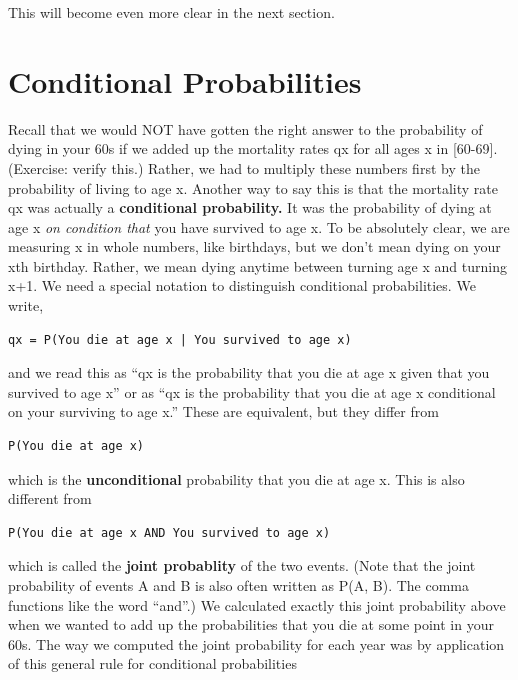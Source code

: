\documentclass[openany]{book}
\begin{document}
This will become even more clear in the next section.

\hypertarget{conditional-probabilities}{%
\section*{Conditional Probabilities}\label{conditional-probabilities}}

Recall that we would NOT have gotten the right answer to the probability of dying in your 60s if we added up the mortality rates qx for all ages x in {[}60-69{]}. (Exercise: verify this.) Rather, we had to multiply these numbers first by the probability of living to age x. Another way to say this is that the mortality rate qx was actually a \textbf{conditional probability.} It was the probability of dying at age x \emph{on condition that} you have survived to age x. To be absolutely clear, we are measuring x in whole numbers, like birthdays, but we don't mean dying on your xth birthday. Rather, we mean dying anytime between turning age x and turning x+1. We need a special notation to distinguish conditional probabilities. We write,

\begin{verbatim}
qx = P(You die at age x | You survived to age x)
\end{verbatim}

and we read this as ``qx is the probability that you die at age x given that you survived to age x'' or as ``qx is the probability that you die at age x conditional on your surviving to age x.'' These are equivalent, but they differ from

\begin{verbatim}
P(You die at age x)
\end{verbatim}

which is the \textbf{unconditional} probability that you die at age x. This is also different from

\begin{verbatim}
P(You die at age x AND You survived to age x)
\end{verbatim}

which is called the \textbf{joint probablity} of the two events. (Note that the joint probability of events A and B is also often written as P(A, B). The comma functions like the word ``and''.) We calculated exactly this joint probability above when we wanted to add up the probabilities that you die at some point in your 60s. The way we computed the joint probability for each year was by application of this general rule for conditional probabilities
\end{document}
